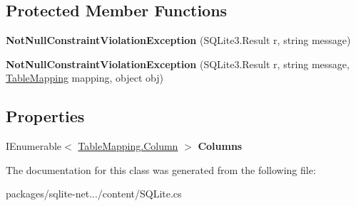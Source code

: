 \subsection*{Protected Member Functions}
\begin{DoxyCompactItemize}
\item 
\hypertarget{classSQLite_1_1NotNullConstraintViolationException_a6c1cdcfe9c9289aefb428bc42861a376}{}{\bfseries Not\+Null\+Constraint\+Violation\+Exception} (S\+Q\+Lite3.\+Result r, string message)\label{classSQLite_1_1NotNullConstraintViolationException_a6c1cdcfe9c9289aefb428bc42861a376}

\item 
\hypertarget{classSQLite_1_1NotNullConstraintViolationException_a1323d85e646b1eb71943d03619291677}{}{\bfseries Not\+Null\+Constraint\+Violation\+Exception} (S\+Q\+Lite3.\+Result r, string message, \hyperlink{classSQLite_1_1TableMapping}{Table\+Mapping} mapping, object obj)\label{classSQLite_1_1NotNullConstraintViolationException_a1323d85e646b1eb71943d03619291677}

\end{DoxyCompactItemize}
\subsection*{Properties}
\begin{DoxyCompactItemize}
\item 
\hypertarget{classSQLite_1_1NotNullConstraintViolationException_a21258090a43872e564b7e7c9faacc920}{}I\+Enumerable$<$ \hyperlink{classSQLite_1_1TableMapping_1_1Column}{Table\+Mapping.\+Column} $>$ {\bfseries Columns}\label{classSQLite_1_1NotNullConstraintViolationException_a21258090a43872e564b7e7c9faacc920}

\end{DoxyCompactItemize}


The documentation for this class was generated from the following file\+:\begin{DoxyCompactItemize}
\item 
packages/sqlite-\/net.../content/S\+Q\+Lite.\+cs\end{DoxyCompactItemize}
